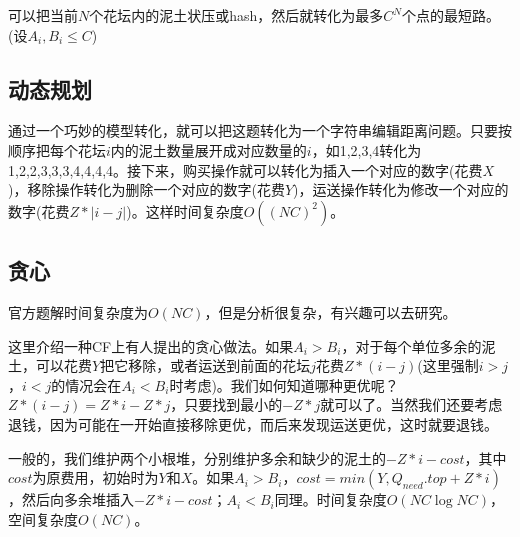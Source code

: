 \documentclass[hyperref,UTF8,12pt,a4paper]{ctexart}
\begin{document}
可以把当前$N$个花坛内的泥土状压或hash，然后就转化为最多$C^N$个点的最短路。(设$A_i,B_i\le C$)

\subsection{动态规划}

通过一个巧妙的模型转化，就可以把这题转化为一个字符串编辑距离问题。只要按顺序把每个花坛$i$内的泥土数量展开成对应数量的$i$，如1,2,3,4转化为1,2,2,3,3,3,4,4,4,4。接下来，购买操作就可以转化为插入一个对应的数字(花费$X$)，移除操作转化为删除一个对应的数字(花费$Y$)，运送操作转化为修改一个对应的数字(花费$Z*|i-j|$)。这样时间复杂度$O((NC)^2)$。

\subsection{贪心}

官方题解时间复杂度为$O(NC)$，但是分析很复杂，有兴趣可以去研究。

这里介绍一种CF上有人提出的贪心做法。如果$A_i>B_i$，对于每个单位多余的泥土，可以花费$Y$把它移除，或者运送到前面的花坛$j$花费$Z*(i-j)$(这里强制$i>j$，$i<j$的情况会在$A_i<B_i$时考虑)。我们如何知道哪种更优呢？$Z*(i-j)=Z*i-Z*j$，只要找到最小的$-Z*j$就可以了。当然我们还要考虑退钱，因为可能在一开始直接移除更优，而后来发现运送更优，这时就要退钱。

一般的，我们维护两个小根堆，分别维护多余和缺少的泥土的$-Z*i-cost$，其中$cost$为原费用，初始时为$Y$和$X$。如果$A_i>B_i$，$cost=min(Y,Q_{need}.top+Z*i)$，然后向多余堆插入$-Z*i-cost$；$A_i<B_i$同理。时间复杂度$O(NC\log NC)$，空间复杂度$O(NC)$。
\end{document}
